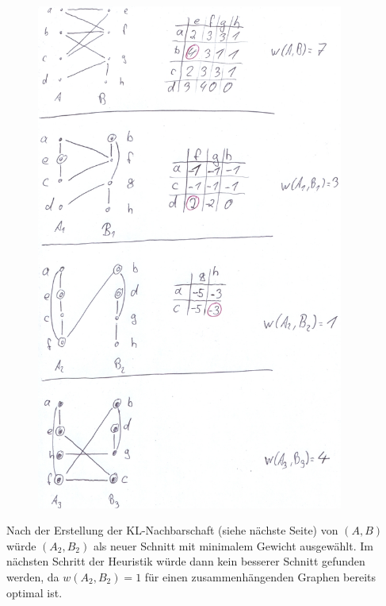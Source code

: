 \documentclass[12pt,a4paper]{article}
\begin{document}
	\begin{figure}%
		\centering
		\includegraphics[width=0.9\textwidth]{9_2.jpg}
	\end{figure}

Nach der Erstellung der KL-Nachbarschaft (siehe nächste Seite) von \((A, B)\) würde \((A_2, B_2)\) als neuer Schnitt mit minimalem Gewicht ausgewählt. Im nächsten Schritt der Heuristik würde dann kein besserer Schnitt gefunden werden, da \(w(A_2, B_2)=1\) für einen zusammenhängenden Graphen bereits optimal ist.
\end{document}
